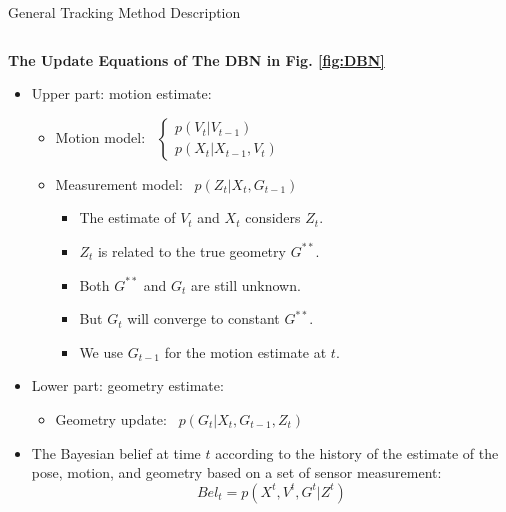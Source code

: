 \documentclass[final,hyperref={pdfpagelabels=false}]{beamer}
\begin{document}
\begin{frame}[t]
\begin{columns}[t]
\begin{column}{0.47\textwidth}
\begin{block}{General Tracking Method Description}
\begin{columns}[t]
	\begin{column}{0.48\textwidth}
			\begin{center}
				\textbf{The Update Equations of The DBN in Fig. \ref{fig:DBN}}
			\end{center}
			\begin{itemize}
				\item Upper part: motion estimate:
				\begin{itemize}
					\item Motion model:~
					$\left\{\begin{array}{l}
					p(V_t|V_{t-1}) \\
					p(X_t|X_{t-1},V_t)
					\end{array}\right.$
					\item Measurement model:~
					$p(Z_t|X_t,G_{t-1})$
					\begin{itemize}
						\item The estimate of $V_t$ and $X_t$ considers $Z_t$.
						\item $Z_t$ is related to the true geometry $G^{**}$.
						\item Both $G^{**}$ and $G_t$ are still unknown.
						\item But $G_t$ will converge to constant $G^{**}$.
						\item We use $G_{t-1}$ for the motion estimate at $t$.
					\end{itemize}
				\end{itemize}
				\item Lower part: geometry estimate:
				\begin{itemize}
					\item Geometry update:~
					$p(G_t|X_t,G_{t-1},Z_t)$
				\end{itemize}
				\item The Bayesian belief at time $t$ according to the history of the estimate of the pose, motion, and geometry based on a set of sensor measurement:
				$$Bel_t=p(X^t,V^t,G^t|Z^t)$$
			\end{itemize}			
	\end{column}
\end{columns}


\end{block}
\end{column}
\end{columns}
\end{frame}
\end{document}
